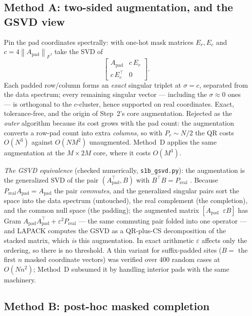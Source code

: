 \documentclass[11pt]{article}
\theoremstyle{definition}
\theoremstyle{remark}
\newcommand{\Apad}{A_{\mathrm{pad}}}
\newcommand{\norm}[1]{\left\lVert #1 \right\rVert}
\newcommand{\code}[1]{\texttt{#1}}
\begin{document}
\subsection{Method A: two-sided augmentation, and the GSVD view}\label{app:A}

Pin the pad coordinates spectrally: with one-hot mask matrices $E_r, E_c$ and
$c = 4\norm{\Apad}_F$, take the SVD of
\[
\begin{bmatrix} \Apad & c\,E_r\\ c\,E_c^{\top} & 0\end{bmatrix}.
\]
Each padded row/column forms an \emph{exact} singular triplet at $\sigma = c$, separated from the
data spectrum; every remaining singular vector --- including the $\sigma\approx 0$ ones --- is
orthogonal to the $c$-cluster, hence supported on real coordinates. Exact, tolerance-free, and the
origin of Step~2's core augmentation. Rejected as the \emph{outer} algorithm because its cost
grows with the pad count: the augmentation converts a row-pad count into extra \emph{columns}, so
with $P_r\sim N/2$ the QR costs $O(N^3)$ against $O(NM^2)$ unaugmented. Method~D applies the same
augmentation at the $M\times 2M$ core, where it costs $O(M^3)$.

\emph{The GSVD equivalence} (checked numerically, \code{s1b\_gsvd.py}): the augmentation is the
generalized SVD of the pair $(\!\Apad^{\top}, B)$ with $B^{\top}B = P_{\mathrm{real}}$
\cite{VanLoan1976,PaigeSaunders1981}. Because $P_{\mathrm{real}}\Apad = \Apad$ the pair
\emph{commutes}, and the generalized singular pairs sort the space into the data spectrum
(untouched), the real complement (the completion), and the common null space (the padding); the
augmented matrix $[\Apad \;\; \varepsilon B]$ has Gram
$\Apad\Apad^{\top} + \varepsilon^2 P_{\mathrm{real}}$ --- the same commuting pair folded into one
operator --- and LAPACK computes the GSVD as a QR-plus-CS decomposition of the stacked matrix,
which \emph{is} this augmentation. In exact arithmetic $\varepsilon$ affects only the ordering, so
there is no threshold. A thin variant for suffix-padded sites ($B=$ the first $n$ masked
coordinate vectors) was verified over 400 random cases at $O(Nn^2)$; Method~D subsumed it by
handling interior pads with the same machinery.

\subsection{Method B: post-hoc masked completion}\label{app:B}
\end{document}
